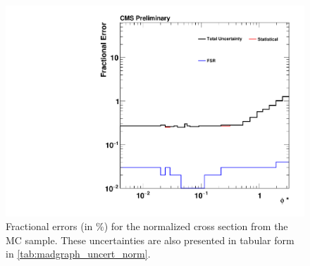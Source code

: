 \begin{figure}[!p]
    \centering
    \includegraphics[width=\textwidth]{figures/madgraph_uncertainty_normalized.pdf}
    \caption[
        Fractional errors for the normalized cross section from the
        \MADGRAPH MC sample.
    ]{
        Fractional errors (in \%) for the normalized cross section from the
        \MADGRAPH MC sample. These uncertainties are also presented in tabular
        form in \cref{tab:madgraph_uncert_norm}.
    }
    \label{fig:madgraph_uncert_norm}
\end{figure}
